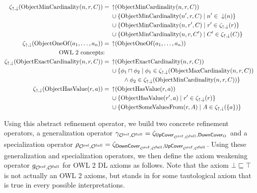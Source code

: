 \begin{widepage}
\begin{align*}
   \zeta_{\mathop{\uparrow}, \mathop{\downarrow}}(\mathrm{ObjectMinCardinality}(n, r, C)) ={} & \mathop{\uparrow} (\mathrm{ObjectMinCardinality}(n, r, C)) \\& \cup \{\mathrm{ObjectMinCardinality}(n', r, C) \mid n' \in \; \mathop{\downarrow} (n)\} \\& \cup \{\mathrm{ObjectMinCardinality}(n, r', C) \mid r' \in \zeta_{\mathop{\uparrow}, \mathop{\downarrow}}(r)\} \\& \cup \{\mathrm{ObjectMinCardinality}(n, r, C') \mid C' \in \zeta_{\mathop{\uparrow}, \mathop{\downarrow}} (C)\} \\
   \zeta_{\mathop{\uparrow}, \mathop{\downarrow}}(\mathrm{ObjectOneOf}(a_1, \dots, a_n)) ={} & \mathop{\uparrow} (\mathrm{ObjectOneOf}(a_1, \dots, a_n)) \\
   \text{OWL 2 concepts:} \quad & \\
   \zeta_{\mathop{\uparrow}, \mathop{\downarrow}}(\mathrm{ObjectExactCardinality}(n, r, C)) ={} & \mathop{\uparrow} (\mathrm{ObjectExactCardinality}(n, r, C)) \\& \cup \{ \phi_1 \sqcap \phi_2 \mid \phi_1 \in \zeta_{\mathop{\uparrow}, \mathop{\downarrow}} (\mathrm{ObjectMaxCardinality}(n, r, C)) \\ \;& \qquad \land \phi_2 \in \zeta_{\mathop{\uparrow}, \mathop{\downarrow}} (\mathrm{ObjectMinCardinality}(n, r, C)) \} \\
   \zeta_{\mathop{\uparrow}, \mathop{\downarrow}}(\mathrm{ObjectHasValue}(r, a)) ={} & \mathop{\uparrow} (\mathrm{ObjectHasValue}(r, a)) \\& \cup \{\mathrm{ObjectHasValue}(r', a) \mid r' \in \zeta_{\mathop{\uparrow}, \mathop{\downarrow}} (r)\} \\& \cup \{\mathrm{ObjectSomeValuesFrom}(r, A) \mid A \in \zeta_{\mathop{\uparrow}, \mathop{\downarrow}} (\{a\})\}
  \end{align*}
\end{widepage}

Using this abstract refinement operator, we build two concrete refinement operators, a generalization operator $\gamma_{{\mathcal{O}^\textnormal{ref}},{\mathcal{O}^\textnormal{full}}} = \zeta_{{\mathsf{UpCover}}_{{\mathcal{O}^\textnormal{ref}},{\mathcal{O}^\textnormal{full}}}, {\mathsf{DownCover}}_\mathrm{O}}$ and a specialization operator $\rho_{{\mathcal{O}^\textnormal{ref}},{\mathcal{O}^\textnormal{full}}} = \zeta_{{\mathsf{DownCover}}_{{\mathcal{O}^\textnormal{ref}},{\mathcal{O}^\textnormal{full}}}, {\mathsf{UpCover}}_{{\mathcal{O}^\textnormal{ref}},{\mathcal{O}^\textnormal{full}}}}$. Using these generalization and specialization operators, we then define the axiom weakening operator $g_{{\mathcal{O}^\textnormal{ref}},{\mathcal{O}^\textnormal{full}}}$ for OWL 2 DL axioms as follows. Note that the axiom $\bot \sqsubseteq \top$ is not actually an OWL 2 axioms, but stands in for some tautological axiom that is true in every possible interpretations.

